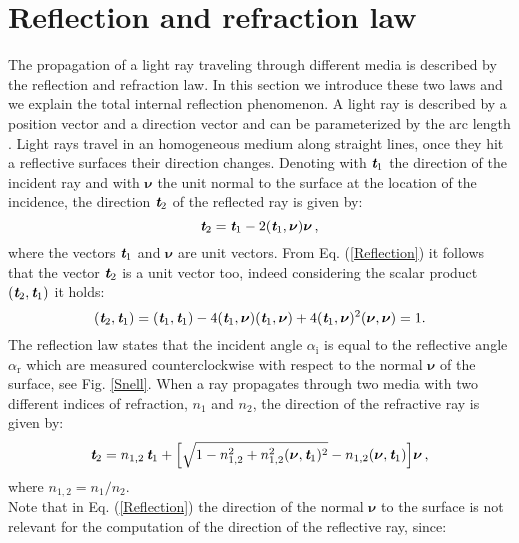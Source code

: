\section{Reflection and refraction law}
The propagation of a light ray traveling through  different media is described by the reflection and refraction law.
In this section we introduce these two laws and we explain the total internal reflection phenomenon.
A light ray is described by a position vector  and a direction vector  and can be parameterized by the arc length .
Light rays travel in an homogeneous medium along straight lines, once they hit a reflective surfaces their direction changes.
 Denoting with $\textit{\textbf{t}}_1$ the direction of the incident ray and with $\boldsymbol{\nu}$ the unit normal to the surface at the location of the incidence, the direction $\textit{\textbf{t}}_2$ of the reflected ray is given by:
 \begin{equation}\label{Reflection}
  \textit{\textbf{t}}_2 = \textit{\textbf{t}}_1-2(\textit{\textbf{t}}_1,\boldsymbol{\nu})\boldsymbol{\nu}\,,
\end{equation}
where the vectors $\textit{\textbf{t}}_1$ and $\boldsymbol{\nu}$ are unit vectors. 
From Eq. (\ref{Reflection}) it follows that the vector  $\textit{\textbf{t}}_2$ is a unit vector too, indeed considering the scalar product $(\textit{\textbf{t}}_2,\textit{\textbf{t}}_1)$ it holds:
\begin{equation}\label{unit_vector}
(\textit{\textbf{t}}_2,\textit{\textbf{t}}_1) = (\textit{\textbf{t}}_1,\textit{\textbf{t}}_1) - 4(\textit{\textbf{t}}_1,\boldsymbol{\nu})(\textit{\textbf{t}}_1,\boldsymbol{\nu})+
4(\textit{\textbf{t}}_1,\boldsymbol{\nu})^2(\boldsymbol{\nu},\boldsymbol{\nu})=1 .
\end{equation} 
The reflection law states that the incident angle $\alpha_\textrm{i}$ is equal to the reflective angle $\alpha_\textrm{r}$ which are measured counterclockwise with respect to the normal $\boldsymbol{\nu}$ of the surface, see Fig. \ref{Snell}.
When a ray propagates through two media with two different indices of refraction, $n_1$ and $n_2$, the direction of the refractive ray is given by:
\begin{equation}\label{Refraction}
\textit{\textbf{t}}_2 = n_{1,2}\,\textit{\textbf{t}}_1+
\Big[\sqrt{1-n_{1,2}^2+n_{1,2}^2(\boldsymbol{\nu},\textit{\textbf{t}}_1)^2}-n_{1,2}(\boldsymbol{\nu},\textit{\textbf{t}}_1) \Big]\boldsymbol{\nu}\,,
\end{equation}
where $n_{1,2}=n_1/n_2$. \\
 \indent Note that in Eq. (\ref{Reflection}) the direction of the normal $\boldsymbol{\nu}$ to the surface is not relevant for the computation of the direction of the reflective ray, since:
